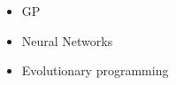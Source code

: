 \begin{itemize}
  \item{GP}
  \item{Neural Networks}
  \item{Evolutionary programming}
\end{itemize}
